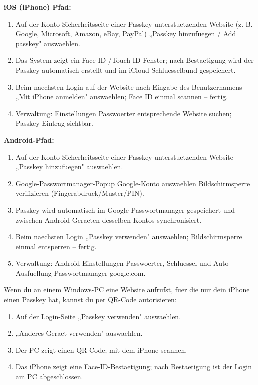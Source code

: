 
\textbf{iOS (iPhone) Pfad:}

\begin{enumerate}
  \item Auf der Konto-Sicherheitsseite einer Passkey-unterstuetzenden Website (z. B. Google, Microsoft, Amazon, eBay, PayPal) „Passkey hinzufuegen / Add passkey" auswaehlen.
  \item Das System zeigt ein Face-ID-/Touch-ID-Fenster; nach Bestaetigung wird der Passkey automatisch erstellt und im iCloud-Schluesselbund gespeichert.
  \item Beim naechsten Login auf der Website nach Eingabe des Benutzernamens „Mit iPhone anmelden" auswaehlen; Face ID einmal scannen – fertig.
  \item Verwaltung: Einstellungen Passwoerter entsprechende Website suchen; Passkey-Eintrag sichtbar.
\end{enumerate}

\textbf{Android-Pfad:}

\begin{enumerate}
  \item Auf der Konto-Sicherheitsseite einer Passkey-unterstuetzenden Website „Passkey hinzufuegen" auswaehlen.
  \item Google-Passwortmanager-Popup Google-Konto auswaehlen Bildschirmsperre verifizieren (Fingerabdruck/Muster/PIN).
  \item Passkey wird automatisch im Google-Passwortmanager gespeichert und zwischen Android-Geraeten desselben Kontos synchronisiert.
  \item Beim naechsten Login „Passkey verwenden" auswaehlen; Bildschirmsperre einmal entsperren – fertig.
  \item Verwaltung: Android-Einstellungen Passwoerter, Schluessel und Auto-Ausfuellung Passwortmanager google.com.
\end{enumerate}


Wenn du an einem Windows-PC eine Website aufrufst, fuer die nur dein iPhone einen Passkey hat, kannst du per QR-Code autorisieren:

\begin{enumerate}
  \item Auf der Login-Seite „Passkey verwenden" auswaehlen.
  \item „Anderes Geraet verwenden" auswaehlen.
  \item Der PC zeigt einen QR-Code; mit dem iPhone scannen.
  \item Das iPhone zeigt eine Face-ID-Bestaetigung; nach Bestaetigung ist der Login am PC abgeschlossen.
\end{enumerate}


